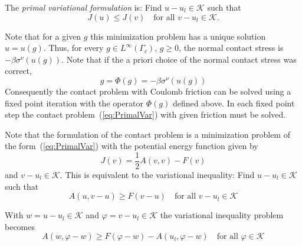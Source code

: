 \documentclass[12pt,a4paper]{article}
\numberwithin{equation}{section}
\numberwithin{table}{section}
\numberwithin{figure}{section}
\newcommand{\half}{\ensuremath{\frac{1}{2}}}
\newcommand{\K}{\ensuremath{\mathcal{K}}}
\renewcommand{\phi}{\varphi}
\renewcommand{\forall}{\text{for all }}
\newcommand{\qforall}{\quad\text{for all }}
\begin{document}
The \emph{primal variational formulation} is: Find $u-u_l\in\K$ such that
\begin{equation}
  \label{eq:PrimalVar}
  J(u) \le J(v) \quad\forall v-u_l\in \K.
\end{equation}

Note that for a given $g$ this minimization problem has a unique solution $u=u(g)$.  Thus,
for every $g\in L^\infty(\Gamma_c)$, $g\ge 0$, the normal contact stress is
$-\beta\sigma^\nu(u(g))$.  Note that if the a priori choice of the normal contact stress
was correct,
\begin{equation}
  \label{eq:12}
  g = \Phi(g) = -\beta\sigma^\nu(u(g))
\end{equation}
Consequently the contact problem with Coulomb friction can be solved using a fixed point
iteration with the operator $\Phi(g)$ defined above.  In each fixed point step the contact
problem~(\ref{eq:PrimalVar}) with given friction must be solved.

Note that the formulation of the contact problem is a minimization problem of the
form~(\ref{eq:PrimalVar}) with the potential energy function given by
\begin{equation}
  \label{eq:PotentialEnergyContact}
  J(v) = \half A(v,v) - F(v)
\end{equation}
and $v-u_l\in\K$.  This is equivalent to the variational inequality:
Find $u-u_l\in\K$ such that
\begin{equation}
  \label{eq:PrimalVarIneq}
  A(u,v-u) \ge F(v-u) \qforall v - u_l\in \K
\end{equation}

With $w=u-u_l\in \K$ and $\phi=v-u_l \in \K$ the variational inequality problem becomes
\begin{equation}
  A(w, \phi-w) \ge F(\phi-w) - A(u_l, \phi-w) \quad\text{for all $\phi\in\K$}
\end{equation}
\end{document}

